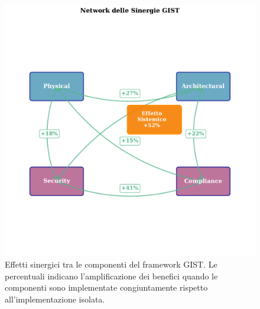 \begin{figure}[htbp]
\centering
\includegraphics[width=1.1\textwidth]{thesis_figures/cap5/figura_5_2_synergies.pdf}



\caption{Effetti sinergici tra le componenti del framework GIST. Le percentuali indicano l'amplificazione dei benefici quando le componenti sono implementate congiuntamente rispetto all'implementazione isolata.}
\label{fig:synergies}
\end{figure}

